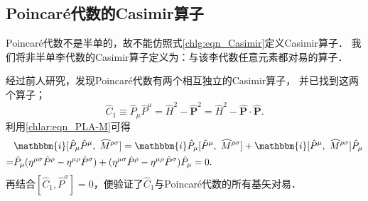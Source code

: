 
\subsection{Poincar\'{e}代数的Casimir算子}\label{chlar:sec_PC}
Poincar\'{e}代数不是半单的，故不能仿照式\eqref{chlg:eqn_Casimir}定义Casimir算子．
我们将非半单李代数的Casimir算子定义为：{\kaishu 与该李代数任意元素都对易的算子．}

经过前人研究，发现Poincar\'{e}代数有两个相互独立的Casimir算子，
并已找到这两个算子；
\begin{equation}\label{chlar:eqn_PA-Casimir-P2}
	\hat{C}_1 \equiv \hat{P}_\mu \hat{P}^\mu = \hat{H}^2 - \boldsymbol{\hat{P}}^2
	= \hat{H}^2 - \boldsymbol{\hat{P}}\cdot \boldsymbol{\hat{P}}.
\end{equation}
利用\eqref{chlar:eqn_PLA-M}可得
\begin{align*}
	&\mathbbm{i} [\hat{P}_\mu\hat{P}^\mu,\ \widehat{M}^{\rho\sigma}] = 
	\mathbbm{i} \hat{P}_\mu [\hat{P}^\mu,\ \widehat{M}^{\rho\sigma}] +\mathbbm{i} [\hat{P}^\mu,\ \widehat{M}^{\rho\sigma}] \hat{P}_\mu \\
	=& \hat{P}_\mu(\eta^{\mu \sigma} \hat{P}^\rho-\eta^{\mu \rho} \hat{P}^\sigma)
	+(\eta^{\mu \sigma} \hat{P}^\rho-\eta^{\mu \rho} \hat{P}^\sigma)\hat{P}_\mu=0.
\end{align*}
再结合$[\hat{C}_1, \hat{P}^\sigma]=0$，便验证了$\hat{C}_1$与Poincar\'{e}代数的所有基矢对易．


